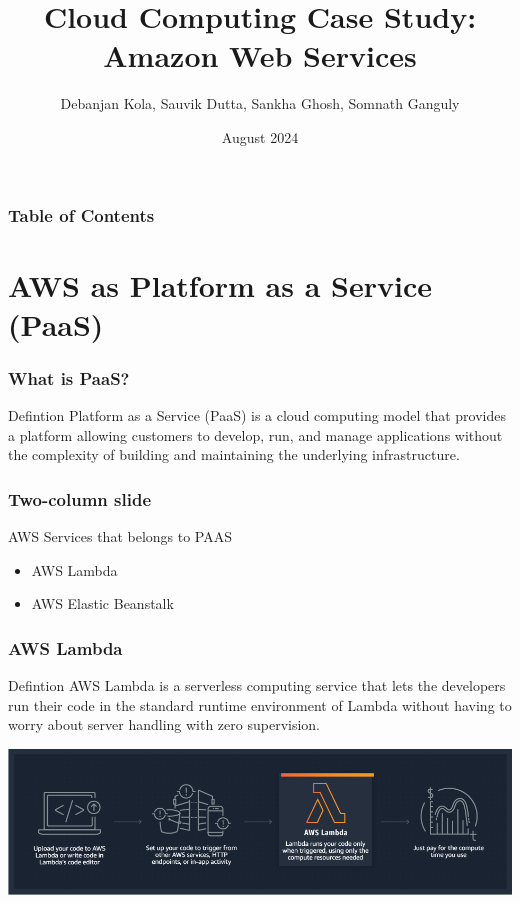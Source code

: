 \documentclass{beamer}
\title[]{Cloud Computing Case Study: Amazon Web Services}
\author[]{Debanjan Kola, Sauvik Dutta, Sankha Ghosh, Somnath Ganguly}
\institute[]{
  Department of Computer Science\\
  Ramakrishna Mission Vivekananda Centenary College
}
\date[]{August 2024}
\begin{document}
\frame{\titlepage}


\begin{frame}
\frametitle{Table of Contents}
\tableofcontents
\end{frame}



\section{AWS as Platform as a Service (PaaS)}

\begin{frame}
\frametitle{What is PaaS?}
\begin{block}{Defintion}
	Platform as a Service (PaaS) is a cloud computing model that provides a platform allowing customers to develop, run, and manage applications without the complexity of building and maintaining the underlying infrastructure.
\end{block}
\end{frame}


\begin{frame}
	\frametitle{Two-column slide}
	\begin{examples}{AWS Services that belongs to PAAS}
		\begin{itemize}
			\item AWS Lambda
			\item AWS Elastic Beanstalk
		\end{itemize}
	\end{examples}		
\end{frame}

\begin{frame}
	\frametitle{AWS Lambda}
	\begin{block}{Defintion}
		AWS Lambda is a serverless computing service that lets the developers run their code in the standard runtime environment of Lambda without having to worry about server handling with zero supervision.
	\end{block}
	
	\begin{center}
	
	\includegraphics[scale=0.35]{product-page-diagram_Lambda-HowItWorks.68a0bcacfcf46fccf04b97f16b686ea44494303f.png}
	\end{center}
\end{frame}
\end{document}
